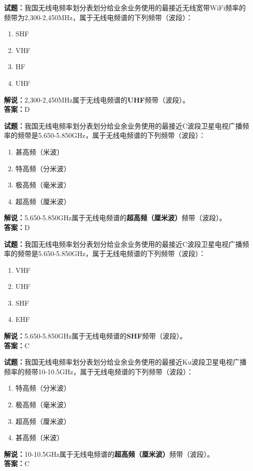 \documentclass{ctexbook}
\begin{document}
\bigskip

\noindent\textbf{试题：}我国无线电频率划分表划分给业余业务使用的最接近无线宽带WiFi频率的频带为2,300-2,450\unit{\MHz}，属于无线电频谱的下列频带（波段）：
\begin{enumerate}[leftmargin=3em]
  \item SHF
  \item VHF
  \item HF
  \item UHF
\end{enumerate}
\noindent\textbf{解说：}2,300-2,450\unit{\MHz}属于无线电频谱的\textbf{UHF}频带（波段）。\\\noindent\textbf{答案：}D

\bigskip

\noindent\textbf{试题：}我国无线电频率划分表划分给业余业务使用的最接近C波段卫星电视广播频率的频带是5.650-5.850\unit{\GHz}，属于无线电频谱的下列频带（波段）：
\begin{enumerate}[leftmargin=3em]
  \item 甚高频（米波）
  \item 特高频（分米波）
  \item 极高频（毫米波）
  \item 超高频（厘米波）
\end{enumerate}
\noindent\textbf{解说：}5.650-5.850\unit{\GHz}属于无线电频谱的\textbf{超高频（厘米波）}频带（波段）。\\\noindent\textbf{答案：}D

\bigskip

\noindent\textbf{试题：}我国无线电频率划分表划分给业余业务使用的最接近C波段卫星电视广播频率的频带是5.650-5.850\unit{\GHz}，属于无线电频谱的下列频带（波段）：
\begin{enumerate}[leftmargin=3em]
  \item VHF
  \item UHF
  \item SHF
  \item EHF
\end{enumerate}
\noindent\textbf{解说：}5.650-5.850\unit{\GHz}属于无线电频谱的\textbf{SHF}频带（波段）。\\\noindent\textbf{答案：}C

\bigskip

\noindent\textbf{试题：}我国无线电频率划分表划分给业余业务使用的最接近Ku波段卫星电视广播频率的频带10-10.5\unit{\GHz}，属于无线电频谱的下列频带（波段）：
\begin{enumerate}[leftmargin=3em]
  \item 特高频（分米波）
  \item 极高频（毫米波）
  \item 超高频（厘米波）
  \item 甚高频（米波）
\end{enumerate}
\noindent\textbf{解说：}10-10.5\unit{\GHz}属于无线电频谱的\textbf{超高频（厘米波）}频带（波段）。\\\noindent\textbf{答案：}C
\end{document}
